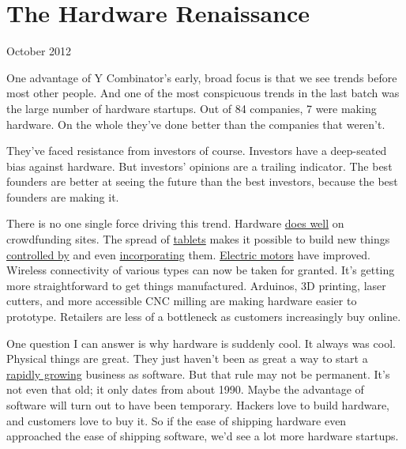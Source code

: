 \chapter{The Hardware Renaissance}


            
              
                


                  
                    October 2012

One advantage of Y Combinator's
                    early, broad focus is that we see trends before most other
                    people. And one of the most conspicuous trends in the last
                    batch was the large number of hardware startups. Out of 84
                    companies, 7 were making hardware. On the whole they've done
                    better than the companies that weren't.

They've
                    faced resistance from investors of course. Investors have a
                    deep-seated bias against hardware. But investors' opinions
                    are a trailing indicator. The best founders are better at
                    seeing the future than the best investors, because the best
                    founders are making it.

There is no one single
                    force driving this trend. Hardware
                    \href{http://bits.blogs.nytimes.com/2012/05/11/pebble-smartwatch-tops-out-at-10-million-on-kickstarter/}{does well}
                    on crowdfunding sites. The spread of
                    \href{http://paulgraham.com/tablets.html}{tablets}
                    makes it possible to build new things
                    \href{http://lockitron.com}{controlled by} and even
                    \href{http://doublerobotics.com}{incorporating} them.
                    \href{http://www.boostedboards.com/}{Electric motors}
                    have improved. Wireless connectivity of various types can
                    now be taken for granted. It's getting more straightforward
                    to get things manufactured. Arduinos, 3D printing, laser
                    cutters, and more accessible CNC milling are making hardware
                    easier to prototype. Retailers are less of a bottleneck as
                    customers increasingly buy online.

One question I
                    can answer is why hardware is suddenly cool. It always was
                    cool. Physical things are great. They just haven't been as
                    great a way to start a
                    \href{http://www.paulgraham.com/growth.html}{rapidly growing} business as
                    software. But that rule may not be permanent. It's not even
                    that old; it only dates from about 1990. Maybe the advantage
                    of software will turn out to have been temporary. Hackers
                    love to build hardware, and customers love to buy it. So if
                    the ease of shipping hardware even approached the ease of
                    shipping software, we'd see a lot more hardware startups.

